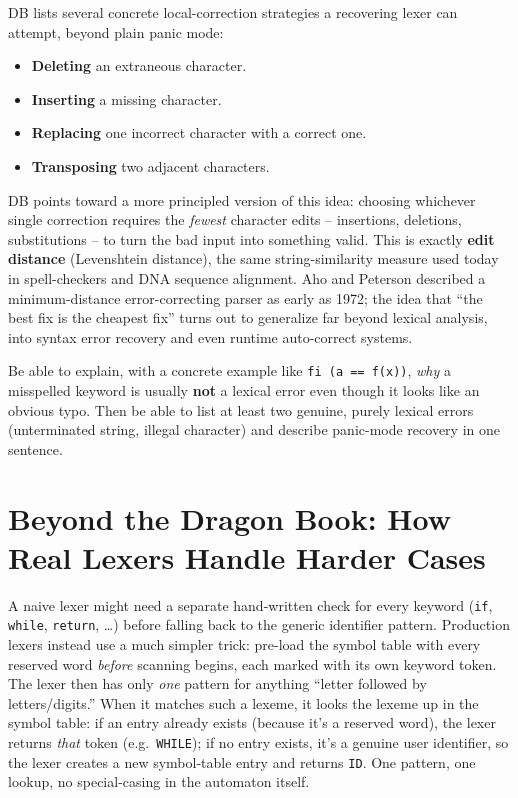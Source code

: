 \documentclass[11pt]{article}
\begin{document}
\dbtag DB lists several concrete local-correction strategies a recovering lexer can attempt,
beyond plain panic mode:

\begin{itemize}
  \item \textbf{Deleting} an extraneous character.
  \item \textbf{Inserting} a missing character.
  \item \textbf{Replacing} one incorrect character with a correct one.
  \item \textbf{Transposing} two adjacent characters.
\end{itemize}

\begin{historynote}
DB points toward a more principled version of this idea: choosing whichever single correction
requires the \emph{fewest} character edits -- insertions, deletions, substitutions -- to turn
the bad input into something valid. This is exactly \textbf{edit distance} (Levenshtein
distance), the same string-similarity measure used today in spell-checkers and DNA sequence
alignment. Aho and Peterson described a minimum-distance error-correcting parser as early as
1972; the idea that ``the best fix is the cheapest fix'' turns out to generalize far beyond
lexical analysis, into syntax error recovery and even runtime auto-correct systems.
\end{historynote}

\begin{examfocus}
Be able to explain, with a concrete example like \texttt{fi (a == f(x))}, \emph{why} a
misspelled keyword is usually \textbf{not} a lexical error even though it looks like an obvious
typo. Then be able to list at least two genuine, purely lexical errors (unterminated string,
illegal character) and describe panic-mode recovery in one sentence.
\end{examfocus}

\section{Beyond the Dragon Book: How Real Lexers Handle Harder Cases}

\begin{enrichment}
A naive lexer might need a separate hand-written check for every keyword (\texttt{if},
\texttt{while}, \texttt{return}, \dots) before falling back to the generic identifier pattern.
Production lexers instead use a much simpler trick: pre-load the symbol table with every
reserved word \emph{before} scanning begins, each marked with its own keyword token. The lexer
then has only \emph{one} pattern for anything ``letter followed by letters/digits.'' When it
matches such a lexeme, it looks the lexeme up in the symbol table: if an entry already exists
(because it's a reserved word), the lexer returns \emph{that} token (e.g.\ \texttt{WHILE}); if
no entry exists, it's a genuine user identifier, so the lexer creates a new symbol-table entry
and returns \texttt{ID}. One pattern, one lookup, no special-casing in the automaton itself.
\end{enrichment}
\end{document}
